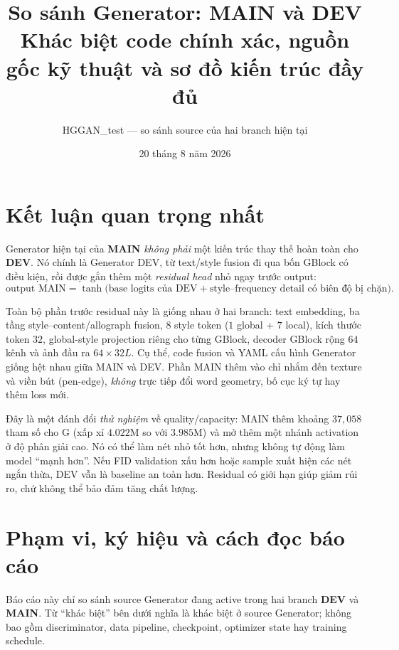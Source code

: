 \documentclass[10pt,a4paper]{article}
\title{\vspace{-1.5em}\textbf{So sánh Generator: MAIN và DEV}\\[-0.25em]
\large Khác biệt code chính xác, nguồn gốc kỹ thuật và sơ đồ kiến trúc đầy đủ}
\author{HGGAN\_test --- so sánh source của hai branch hiện tại}
\date{20 tháng 8 năm 2026}
\newcommand{\dev}{\textcolor{blue!65!black}{\textbf{DEV}}}
\newcommand{\mainbranch}{\textcolor{orange!55!black}{\textbf{MAIN}}}
\begin{document}
\maketitle
\vspace{-1.0em}

\section*{Kết luận quan trọng nhất}

Generator hiện tại của \mainbranch{} \emph{không phải} một kiến trúc thay thế hoàn toàn cho \dev. Nó chính là Generator DEV, từ text/style fusion đi qua bốn GBlock có điều kiện, rồi được gắn thêm một \emph{residual head} nhỏ ngay trước output:
\[
  \text{output MAIN}=\tanh\big(\text{base logits của DEV}+\text{style--frequency detail có biên độ bị chặn}\big).
\]

Toàn bộ phần trước residual này là giống nhau ở hai branch: text embedding, ba tầng style--content/allograph fusion, $8$ style token ($1$ global + $7$ local), kích thước token $32$, global-style projection riêng cho từng GBlock, decoder GBlock rộng $64$ kênh và ảnh đầu ra $64\times32L$. Cụ thể, code fusion và YAML cấu hình Generator giống hệt nhau giữa MAIN và DEV. Phần MAIN thêm vào chỉ nhắm đến texture và viền bút (pen-edge), \emph{không} trực tiếp đổi word geometry, bố cục ký tự hay thêm loss mới.

Đây là một đánh đổi \emph{thử nghiệm} về quality/capacity: MAIN thêm khoảng $37{,}058$ tham số cho G (xấp xỉ $4.022$M so với $3.985$M) và mở thêm một nhánh activation ở độ phân giải cao. Nó có thể làm nét nhỏ tốt hơn, nhưng không tự động làm model ``mạnh hơn''. Nếu FID validation xấu hơn hoặc sample xuất hiện các nét ngắn thừa, DEV vẫn là baseline an toàn hơn. Residual có giới hạn giúp giảm rủi ro, chứ không thể bảo đảm tăng chất lượng.

\section{Phạm vi, ký hiệu và cách đọc báo cáo}

Báo cáo này chỉ so sánh source Generator đang active trong hai branch \dev{} và \mainbranch{}. Từ ``khác biệt'' bên dưới nghĩa là khác biệt ở source Generator; không bao gồm discriminator, data pipeline, checkpoint, optimizer state hay training schedule.
\end{document}
